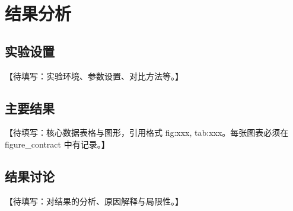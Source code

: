 \section{结果分析}\label{sec:results}


\subsection{实验设置}\label{subsec:experiment_setup}

【待填写：实验环境、参数设置、对比方法等。】

\subsection{主要结果}\label{subsec:main_results}

【待填写：核心数据表格与图形，引用格式 fig:xxx, tab:xxx。每张图表必须在 figure_contract 中有记录。】

\subsection{结果讨论}\label{subsec:discussion}

【待填写：对结果的分析、原因解释与局限性。】
